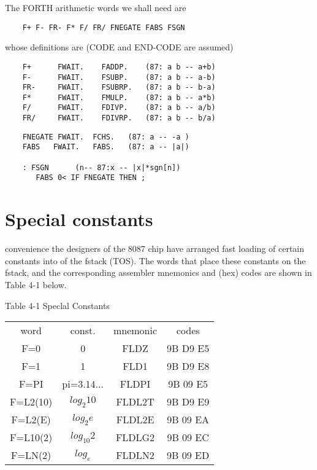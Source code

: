 The FORTH arithmetic words we shall need are
\begin{lstlisting}
    F+ F- FR- F* F/ FR/ FNEGATE FABS FSGN
\end{lstlisting}
whose definitions are (CODE and END-CODE are assumed)

\begin{lstlisting}
    F+      FWAIT.    FADDP.    (87: a b -- a+b)
    F-      FWAIT.    FSUBP.    (87: a b -- a-b)
    FR-     FWAIT.    FSUBRP.   (87: a b -- b-a)
    F*      FWAIT.    FMULP.    (87: a b -- a*b)
    F/      FWAIT.    FDIVP.    (87: a b -- a/b)
    FR/     FWAIT.    FDIVRP.   (87: a b -- b/a)
\end{lstlisting}

\begin{lstlisting}
    FNEGATE FWAIT.  FCHS.   (87: a -- -a )
    FABS   FWAIT.   FABS.   (87: a -- |a|)

    : FSGN      (n-- 87:x -- |x|*sgn[n])
       FABS 0< IF FNEGATE THEN ;
\end{lstlisting}

\section{Special constants}

 convenience the designers of the 8087 chip have arranged fast loading of certain constants into  of the fstack (TOS). The words that place these constants on the fstack, and the corresponding assembler mnemonics and (hex) codes are shown in Table 4-1 below.

Table 4-1 Speclal Constants
\begin{center}
    \begin{tabular}{|c c c c|}
        \hline
        word      & const.      & mnemonic & codes     \\
        F=0       & 0           & FLDZ     & 9B D9 E5  \\
        F=1       & 1           & FLD1     & 9B D9 E8  \\
        F=PI      & pi=3.14...  & FLDPI    & 9B 09 E5  \\
        F=L2(10)  & $log_{2}10$ & FLDL2T   & 9B D9 E9  \\ 
        F=L2(E)   & $log_{2}e$  & FLDL2E   & 9B 09 EA  \\
        F=L10(2)  & $log_{10}2$ & FLDLG2   & 9B 09 EC  \\
        F=LN(2)   & $log_{e}$   & FLDLN2   & 9B 09 ED  \\
        \hline
    \end{tabular}
\end{center}

